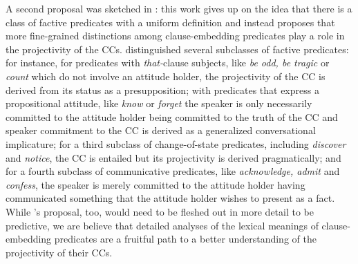 \documentclass[11pt,fleqn]{article}
\newcommand{\6}{\mbox{$[\hspace*{-.6mm}[$}}
\newcommand{\9}{\mbox{$]\hspace*{-.6mm}]$}}
\newcommand{\citepos}[1]{\citeauthor{#1}'s \citeyear{#1}}
\newcommand{\citetpos}[1]{\citeauthor{#1}'s (\citeyear{#1})}
\begin{document}
{A second proposal was sketched in \citealt{karttunen2016}: this work gives up on the idea that there is a class of factive predicates with a uniform definition and instead proposes that more fine-grained distinctions among clause-embedding predicates play a role in the projectivity of the CCs. \citet{karttunen2016} distinguished several subclasses of factive predicates: for instance, for predicates with {\em that-}clause subjects, like {\em be odd, be tragic} or {\em count} which do not involve an attitude holder, the projectivity of the CC is derived from its status as a presupposition; with predicates that express a propositional attitude, like {\em know} or {\em forget} the speaker is only necessarily committed to the attitude holder being committed to the truth of the CC and speaker commitment to the CC is derived as a generalized conversational implicature; for a third subclass of change-of-state predicates, including {\em discover} and {\em notice}, the CC is entailed but its projectivity is derived pragmatically; and for a fourth subclass of communicative predicates, like {\em acknowledge, admit} and {\em confess}, the speaker is merely committed to the attitude holder having communicated something that the attitude holder wishes to present as a fact. While \citepos{karttunen2016} proposal, too, would need to be fleshed out in more detail to be predictive, we are believe that detailed analyses of the lexical meanings of clause-embedding predicates are a fruitful path to a better understanding of the projectivity of their CCs.




}
\end{document}
